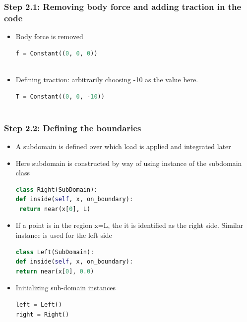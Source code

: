 \documentclass{beamer}
\begin{document}
 \begin{frame}[fragile]
\frametitle{Step 2.1: Removing body force and adding traction in the code}
\begin{itemize}
		\vfill
		\item{Body force is removed}
		\begin{lstlisting}[language=Python, basicstyle=\ttfamily\small,  keywordstyle=\color{blue}]
	f = Constant((0, 0, 0))
		
\end{lstlisting}
\end{itemize}

\begin{itemize}
		\vfill
		\item{Defining traction: arbitrarily choosing -10 as the value here.}
		\begin{lstlisting}[language=Python, basicstyle=\ttfamily\small,  keywordstyle=\color{blue}]
	T = Constant((0, 0, -10))
		
\end{lstlisting}
	
		\vfill
\end{itemize}
\end{frame}

 \begin{frame}[fragile]
\frametitle{ Step 2.2: Defining the boundaries}
\begin{itemize}
		\vfill
		\item{A subdomain is defined over which load is applied and integrated later}
		\vfill
		\item{Here subdomain is constructed by way of using instance of the subdomain class}
		\begin{lstlisting}[language=Python, basicstyle=\ttfamily\small,  keywordstyle=\color{blue}]
class Right(SubDomain):
def inside(self, x, on_boundary):
 return near(x[0], L)

\end{lstlisting}

		\vfill
		\item{If a point is in the region x=L, the it is identified as the right side. Similar instance is used for the left side}
				\begin{lstlisting}[language=Python, basicstyle=\ttfamily\small,  keywordstyle=\color{blue}]
class Left(SubDomain):
def inside(self, x, on_boundary):
return near(x[0], 0.0)
\end{lstlisting}
		\vfill
		\item{Initializing sub-domain instances}
		\begin{lstlisting}[language=Python, basicstyle=\ttfamily\small,  keywordstyle=\color{blue}]
left = Left()
right = Right()

\end{lstlisting}
		
\end{itemize}
\end{frame}
\end{document}
